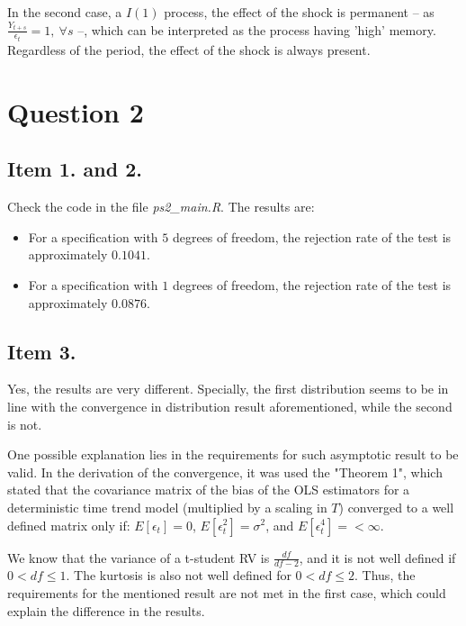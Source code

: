 \documentclass[12pt]{article}
\begin{document}
In the second case, a $I(1)$ process, the effect of the shock is permanent -- as $\frac{Y_{t+s}}{\epsilon_{t}} = 1,~ \forall s$ --, which can be interpreted as the process having 'high' memory. Regardless of the period, the effect of the shock is always present.



\section*{Question 2}

\subsection*{Item 1. and 2.}
Check the code in the file \textit{ps2\_main.R}. The results are:

\begin{itemize}
    \item For a specification with $5$ degrees of freedom, the rejection rate of the test is approximately $0.1041$.
    \item For a specification with $1$ degrees of freedom, the rejection rate of the test is approximately $0.0876$.
\end{itemize}


\subsection*{Item 3.}

Yes, the results are very different. Specially, the first distribution seems to be in line with the convergence in distribution result aforementioned, while the second is not.

One possible explanation lies in the requirements for such asymptotic result to be valid. In the derivation of the convergence, it was used the "Theorem 1", which stated that the covariance matrix of the bias of the OLS estimators for a deterministic time trend model (multiplied by a scaling in $T$) converged to a well defined matrix only if: $E[\epsilon_t] = 0$, $E[\epsilon^2_t] = \sigma^2$, and  $E[\epsilon^4_t] = < \infty$.

We know that the variance of a t-student RV is $\frac{df}{df-2}$, and it is not well defined if $0 < df \leq 1$. The kurtosis is also not well defined for $0 < df \leq 2$. Thus, the requirements for the mentioned result are not met in the first case, which could explain the difference in the results.
\end{document}
